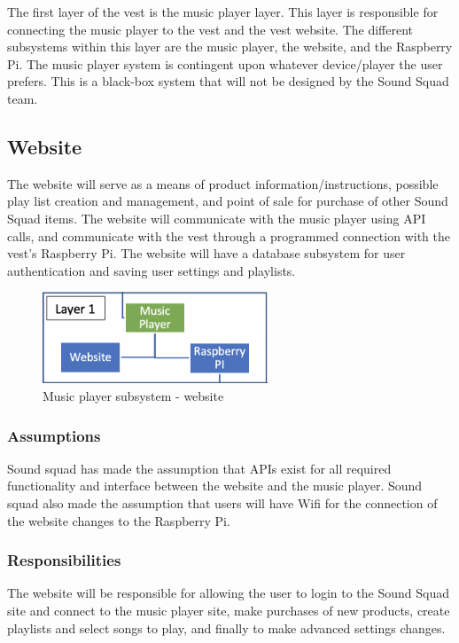 The first layer of the vest is the music player layer. This layer is responsible for connecting the music player to the vest and the vest website. The different subsystems within this layer are the music player, the website, and the Raspberry Pi. The music player system is contingent upon whatever device/player the user prefers. This is a black-box system that will not be designed by the Sound Squad team.

\subsection{Website}
The website will serve as a means of product information/instructions, possible play list creation and management, and point of sale for purchase of other Sound Squad items. The website will communicate with the music player using API calls, and communicate with the vest through a programmed connection with the vest's Raspberry Pi. The website will have a database subsystem for user authentication and saving user settings and playlists.

\begin{figure}[h!]
	\centering
 	\includegraphics[width=0.60\textwidth]{images/subsystem1}
 \caption{Music player subsystem - website}
\end{figure}

\subsubsection{Assumptions}
Sound squad has made the assumption that APIs exist for all required functionality and interface between the website and the music player. Sound squad also made the assumption that users will have Wifi for the connection of the website changes to the Raspberry Pi.

\subsubsection{Responsibilities}
The website will be responsible for allowing the user to login to the Sound Squad site and connect to the music player site, make purchases of new products, create playlists and select songs to play, and finally to make advanced settings changes.

